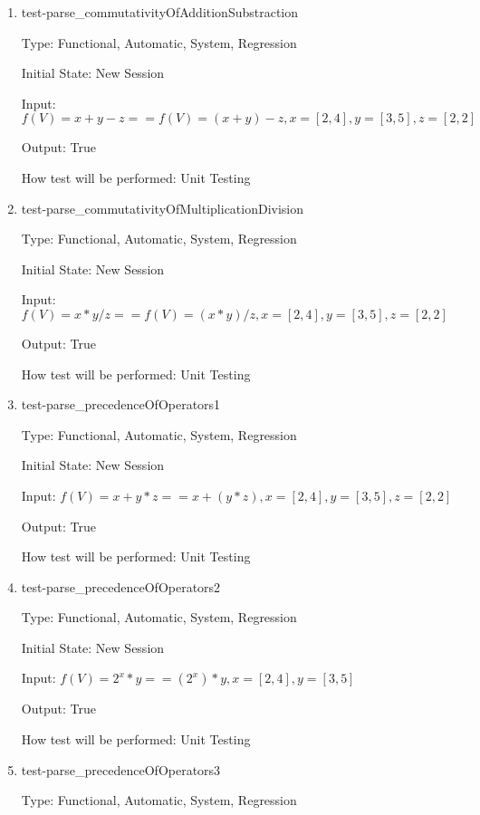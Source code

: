 \documentclass[12pt, titlepage]{article}
\begin{document}
\begin{enumerate}
	
	\item{test-parse\_commutativityOfAdditionSubstraction}
	
	Type: Functional, Automatic, System, Regression
	
	Initial State: New Session
	
	Input: $f(V) = x + y - z == f(V) = (x + y) - z, x = [2,4], y = [3,5], z = 
	[2,2]$
	
	Output: True
	
	How test will be performed: Unit Testing\\
	
	\item{test-parse\_commutativityOfMultiplicationDivision}
	
	Type: Functional, Automatic, System, Regression
	
	Initial State: New Session
	
	Input: $f(V) = x * y / z == f(V) = (x * y) / z, x = [2,4], y = [3,5], z = 
	[2,2]$
	
	Output: True
	
	How test will be performed: Unit Testing\\
	
	\item{test-parse\_precedenceOfOperators1}
	
	Type: Functional, Automatic, System, Regression
	
	Initial State: New Session
	
	Input: $f(V) = x + y * z == x + (y * z), x = [2,4], y = [3,5], z = [2,2]$
	
	Output: True
	
	How test will be performed: Unit Testing\\
	
	\item{test-parse\_precedenceOfOperators2}
	
	Type: Functional, Automatic, System, Regression
	
	Initial State: New Session
	
	Input: $f(V) = 2^x * y == (2^x) * y, x = [2,4], y = [3,5]$
	
	Output: True
	
	How test will be performed: Unit Testing\\
	
	\item{test-parse\_precedenceOfOperators3}
	
	Type: Functional, Automatic, System, Regression
	

\end{enumerate}
\end{document}
